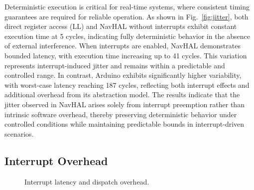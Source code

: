 Deterministic execution is critical for real-time systems, where consistent timing guarantees are required for reliable operation. As shown in Fig.~\ref{fig:jitter}, both direct register access (LL) and NavHAL without interrupts exhibit constant execution time at 5 cycles, indicating fully deterministic behavior in the absence of external interference. When interrupts are enabled, NavHAL demonstrates bounded latency, with execution time increasing up to 41 cycles. This variation represents interrupt-induced jitter and remains within a predictable and controlled range. In contrast, Arduino exhibits significantly higher variability, with worst-case latency reaching 187 cycles, reflecting both interrupt effects and additional overhead from its abstraction model. The results indicate that the jitter observed in NavHAL arises solely from interrupt preemption rather than intrinsic software overhead, thereby preserving deterministic behavior under controlled conditions while maintaining predictable bounds in interrupt-driven scenarios.

\subsection{Interrupt Overhead}

\begin{figure}[H]
\centering
{}
\caption{Interrupt latency and dispatch overhead.}
\label{fig:interrupt}
\end{figure}

